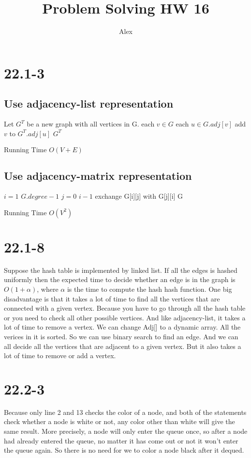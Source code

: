 \documentclass[a4paper]{article}
\author{Alex}
\title{Problem Solving HW 16}
\begin{document}
\maketitle
\section*{22.1-3}
\subsection*{Use adjacency-list representation}
\begin{codebox}
\li Let $G^T$ be a new graph with all vertices in G.
\li \For each $v \in G$ 
\li 	\Do \For each $u \in G.adj[v]$
\li		\Do add $v$ to $G^T.adj[u]$
		\End
	\End 
\li \Return $G^T$
\end{codebox}
Running Time $O(V+E)$
\subsection* {Use adjacency-matrix representation}
\begin{codebox}
\li \For $i = 1$  \To $G.degree - 1$
\Do
\li \For $j = 0$ \To $i - 1$
\Do
\li exchange G[i][j] with G[j][i]
\End 
\End
\li \Return G
\end{codebox}
Running Time $O(V^2)$
\section*{22.1-8}
Suppose the hash table is implemented by linked list. If all the edges is hashed uniformly
then the expected time to decide whether an edge is in the graph is $O(1+\alpha)$, where $\alpha$ is the time to compute the hash hash function.
One big disadvantage is that it takes a lot of time to find all the vertices that are connected with a given vertex. Because you have to go through all the hash table or you need to check all other possible vertices. And like
adjacency-list, it takes a lot of time to remove a vertex. We can change Adj[] to a dynamic array. All the verices in it is sorted. So we can use binary search to find an edge. And we can all decide all the vertices that are adjacent to a given vertex. But
it also takes a lot of time to remove or add a vertex. 
\section*{22.2-3}
Because only line 2 and 13 checks the color of a node, and both of the statements check whether a node is white or not, any color other than white will give the same result. More precisely, a node will only enter the queue once, so after a node had already entered the queue, no matter it has come out or not it won't enter the queue again. So there is no need for we to color a node black after it dequed.
\end{document}
